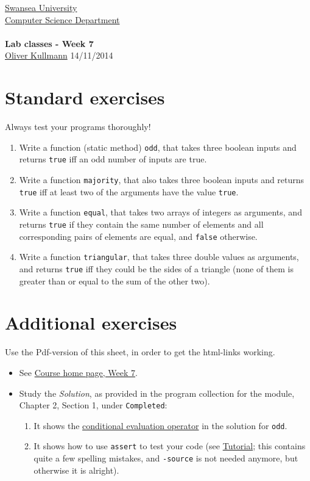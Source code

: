 \documentclass[11pt]{article}
\newcommand{\Java}{\lstset{language=Java,keywordstyle=\bfseries,breaklines,breakindent=30pt}}
\begin{document}
\begin{center}
  \href{http://www.swan.ac.uk/}{Swansea University}\\
  \href{http://www.swan.ac.uk/compsci/}{Computer Science Department}\\[1ex]
  \href{\chp}{\module}\\[1ex]
  \textbf{Lab classes - Week 7}\\
  \href{http://cs.swan.ac.uk/~csoliver}{Oliver Kullmann} 14/11/2014
\end{center}


\section{Standard exercises}
\label{sec:stdex}

\Java

Always test your programs thoroughly!

\begin{enumerate}
\item Write a function (static method) \texttt{odd}, that takes three boolean inputs and returns \texttt{true} iff an odd number of inputs are true.
\item Write a function \texttt{majority}, that also takes three boolean inputs and returns \texttt{true} iff at least two of the arguments have the value \texttt{true}.
\item Write a function \texttt{equal}, that takes two arrays of integers as arguments, and returns \texttt{true} if they contain the same number of elements and all corresponding pairs of elements are equal, and \texttt{false} otherwise.
\item Write a function \texttt{triangular}, that takes three double values as arguments, and returns \texttt{true} iff they could be the sides of a triangle (none of them is greater than or equal to the sum of the other two). 
\end{enumerate}


\section{Additional exercises}
\label{sec:addex}

Use the Pdf-version of this sheet, in order to get the html-links working.
\begin{itemize}
\item See \href{\chp#ExercisesWeek07}{Course home page, Week 7}.
\item Study the \emph{Solution}, as provided in the program collection for the module, Chapter 2, Section 1, under \texttt{Completed}:
  \begin{enumerate}
  \item It shows the \href{http://www.cafeaulait.org/course/week2/43.html}{conditional evaluation operator} in the solution for \texttt{odd}.
  \item It shows how to use \texttt{assert} to test your code (see \href{http://sqa.fyicenter.com/FAQ/JUnit/What_Is_Java_assert_Statement_.html}{Tutorial}; this contains quite a few spelling mistakes, and \texttt{-source} is not needed anymore, but otherwise it is alright).
  \end{enumerate}
\end{itemize}
\end{document}
